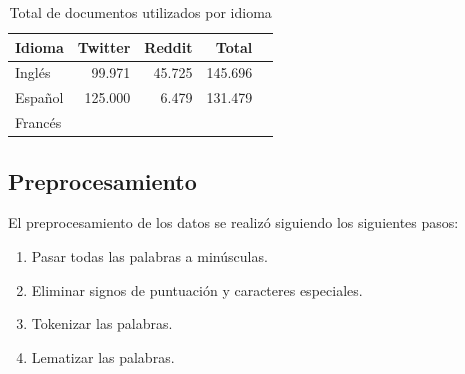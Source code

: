 \begin{table}[H]
\centering
\caption{Total de documentos utilizados por idioma}
\label{tab:docs}
\begin{tabular}{lrrrr}
\hline
\textbf{Idioma} & \textbf{Twitter} & \textbf{Reddit} & \textbf{Total} \\ \hline
Inglés          & 99.971           & 45.725          & 145.696        \\
Español         & 125.000          & 6.479           & 131.479        \\
Francés         &                  &                 &                \\ \hline
\end{tabular}
\end{table}

\subsection{Preprocesamiento}

El preprocesamiento de los datos se realizó siguiendo los siguientes pasos:
\begin{enumerate}
    \item Pasar todas las palabras a minúsculas.
    \item Eliminar signos de puntuación y caracteres especiales.
    \item Tokenizar las palabras.
    \item Lematizar las palabras.
\end{enumerate}


